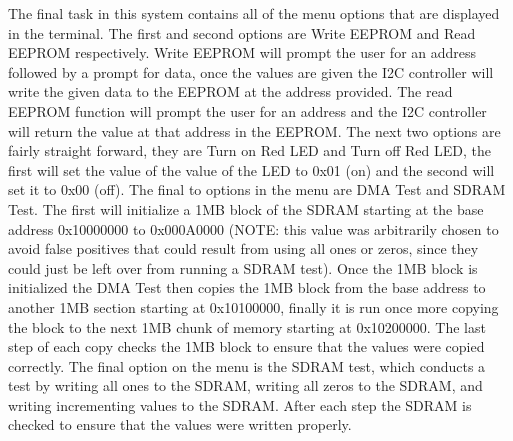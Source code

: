 \documentclass[10pt,a4paper]{article}
\begin{document}
	The final task in this system contains all of the menu options that are displayed in the terminal. The first and second options are Write EEPROM and Read EEPROM respectively. Write EEPROM will prompt the user for an address followed by a prompt for data, once the values are given the I2C controller will write the given data to the EEPROM at the address provided. The read EEPROM function will prompt the user for an address and the I2C controller will return the value at that address in the EEPROM. The next two options are fairly straight forward, they are Turn on Red LED and Turn off Red LED, the first will set the value of the value of the LED to 0x01 (on) and the second will set it to 0x00 (off). The final to options in the menu are DMA Test and SDRAM Test. The first will initialize a 1MB block of the SDRAM starting at the base address 0x10000000 to 0x000A0000 (NOTE: this value was arbitrarily chosen to avoid false positives that could result from using all ones or zeros, since they could just be left over from running a SDRAM test). Once the 1MB block is initialized the DMA Test then copies the 1MB block from the base address to another 1MB section starting at 0x10100000, finally it is run once more copying the block to the next 1MB chunk of memory starting at 0x10200000. The last step of each copy checks the 1MB block to ensure that the values were copied correctly. The final option on the menu is the SDRAM test, which conducts a test by writing all ones to the SDRAM, writing all zeros to the SDRAM, and writing incrementing values to the SDRAM. After each step the SDRAM is checked to ensure that the values were written properly. 
\end{document}
